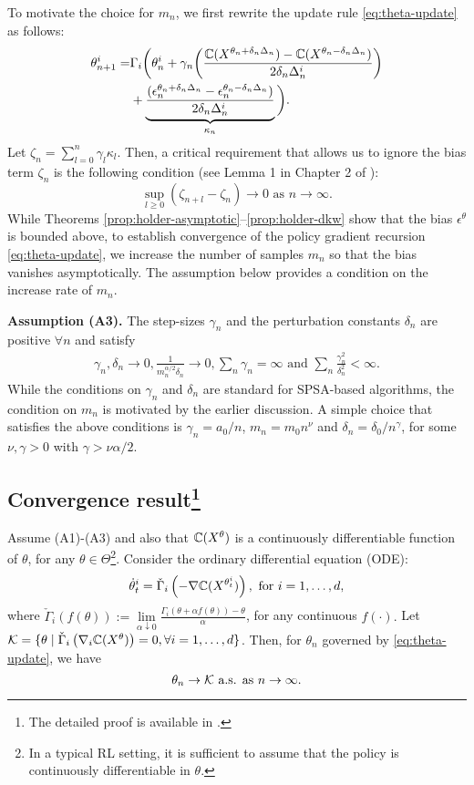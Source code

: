 To motivate the choice for $m_n$, we first rewrite the update rule \eqref{eq:theta-update} as follows:
\begin{align*}
\theta^{i}_{n+1}  = & \Gamma_{i}\bigg( \theta^{i}_n +  \gamma_n \bigg( \frac{\mathbb{C}(X^{\theta_n +\delta_n\Delta_n}) - \mathbb{C}(X^{\theta_n-\delta_n\Delta_n})}{2\delta_n\Delta_n^{i}}\bigg) \\
&+ \underbrace{\frac{(\epsilon_n^{\theta_n +\delta_n\Delta_n} - \epsilon_n^{\theta_n-\delta_n\Delta_n})}{2\delta_n\Delta_n^{i}}}_{\kappa_n}\bigg).
\end{align*}
Let $\zeta_n = \sum_{l = 0}^{n} \gamma_l \kappa_{l}$. Then, a critical requirement that allows us to ignore the bias term $\zeta_n$ is the following condition (see Lemma 1 in Chapter 2 of \cite{borkar2008stochastic}): 
$$\sup_{l\ge0} \left (\zeta_{n+l} - \zeta_n \right) \rightarrow 0 \text{ as } n\rightarrow\infty.$$ 
While Theorems \ref{prop:holder-asymptotic}--\ref{prop:holder-dkw} show that the bias $\epsilon^\theta$ is bounded above, to establish convergence of the policy gradient recursion \eqref{eq:theta-update}, we increase the number of samples $m_n$ so that the bias vanishes asymptotically.  The assumption below provides a condition on the increase rate of $m_n$.

\noindent\textbf{Assumption (A3).}  The step-sizes $\gamma_n$ and the perturbation constants 
$\delta_n$ are positive $\forall n$ and satisfy
\begin{align*}
\gamma_n, \delta_n \rightarrow 0, \frac{1}{m_n^{\alpha/2}\delta_n}\rightarrow 0,  \sum_n \gamma_n=\infty \text{ and } \sum_n \frac{\gamma_n^2}{\delta_n^2}<\infty. 
\end{align*}
While the conditions on $\gamma_n$ and $\delta_n$ are standard for SPSA-based algorithms, the condition on $m_n$ is motivated by the earlier discussion. 
A simple choice that satisfies the above conditions is $\gamma_n = a_0/n$, $m_n = m_0 n^\nu$ and $\delta_n = \delta_0/{n^\gamma}$, for some $\nu, \gamma >0$ with $\gamma > \nu\alpha/2$.

\subsection{Convergence result\protect\footnote{The detailed proof is available in \cite{Pracheng2015cpt}.}}
\begin{theorem}
\label{thm:1spsa-conv}
Assume (A1)-(A3) and also that $\mathbb{C}(X^\theta)$ is a continuously differentiable function of $\theta$, for any $\theta \in \Theta$\footnote{In a typical RL setting, it is sufficient to assume that the policy is continuously differentiable in $\theta$.}.
Consider the  ordinary differential equation (ODE): 
$$\dot\theta^{i}_t = \check\Gamma_{i}\left(- \nabla \mathbb{C}(X^{\theta^{i}_t})\right), \text{ for }i=1,\dots,d,$$ 
where 
$\check\Gamma_{i}(f(\theta)) := \lim\limits_{\alpha \downarrow 0} \frac{\Gamma_{i}(\theta + \alpha f(\theta)) - \theta}{\alpha}$, for any continuous $f(\cdot).$
 Let $\mathcal{K} = \{\theta \mid \check\Gamma_{i} \left(\nabla_i \mathbb{C}(X^{\theta})\right)=0, \forall i=1,\ldots,d\}$. Then, for $\theta_n$ governed by \eqref{eq:theta-update}, we have
$$\theta_n \rightarrow \mathcal{K} \text{ a.s. as } n\rightarrow \infty.$$
\end{theorem}

